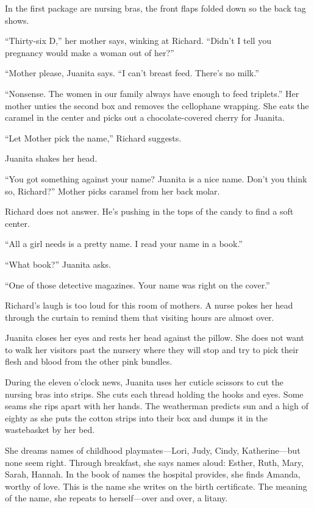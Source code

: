 \documentclass[twoside,10pt]{book}
\begin{document}
In the first package are nursing bras, the front flaps folded down so
the back tag shows.

``Thirty-six D,'' her mother says, winking at Richard. ``Didn't I tell
you pregnancy would make a woman out of her?''

``Mother please, Juanita says. ``I can't breast feed. There's no milk.''

``Nonsense. The women in our family always have enough to feed
triplets.'' Her mother unties the second box and removes the cellophane
wrapping. She eats the caramel in the center and picks out a
chocolate-covered cherry for Juanita.

``Let Mother pick the name,'' Richard suggests.

Juanita shakes her head.

``You got something against your name? Juanita is a nice name. Don't you
think so, Richard?'' Mother picks caramel from her back molar.

Richard does not answer. He's pushing in the tops of the candy to find a
soft center.

``All a girl needs is a pretty name. I read your name in a book.''

``What book?'' Juanita asks.

``One of those detective magazines. Your name was right on the cover.''

Richard's laugh is too loud for this room of mothers. A nurse pokes her
head through the cur­tain to remind them that visiting hours are almost
over.

Juanita closes her eyes and rests her head against the pillow. She does
not want to walk her visitors past the nursery where they will stop and
try to pick their flesh and blood from the other pink bundles.

During the eleven o'clock news, Juanita uses her cuticle scissors to cut
the nursing bras into strips. She cuts each thread holding the hooks and
eyes. Some seams she rips apart with her hands. The weatherman predicts
sun and a high of eighty as she puts the cotton strips into their box
and dumps it in the wastebasket by her bed.

She dreams names of childhood playmates---Lori, Judy, Cindy,
Katherine---but none seem right. Through breakfast, she says names
aloud: Esther, Ruth, Mary, Sarah, Hannah. In the book of names the
hospital provides, she finds Amanda, worthy of love. This is the name
she writes on the birth cer­tificate. The meaning of the name, she
repeats to herself---over and over, a litany.
\end{document}
